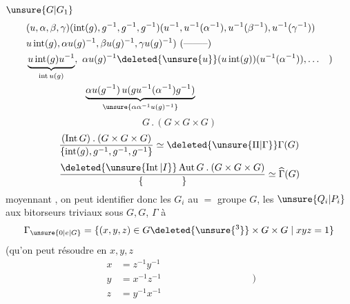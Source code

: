 \(\unsure{G|G_1}\)
\[
\begin{aligned}
 &(u,\alpha,\beta,\gamma)(\operatorname{int}(g),g^{-1},g^{-1},g^{-1})
 (u^{-1},u^{-1}(\alpha^{-1}),u^{-1}(\beta^{-1}),u^{-1}(\gamma^{-1}))\\
 &u\operatorname{int}(g),\alpha u(g)^{-1},\beta u(g)^{-1},\gamma u(g)^{-1})\ (\text{--------})\\
 &\underbrace{u\operatorname{int}(g)u^{-1}}_{\operatorname{int}u(g)},\
 \alpha u(g)^{-1}\deleted{\unsure{u}}(u\operatorname{int}(g))(u^{-1}(\alpha^{-1})),\ldots\quad)\\
 &\hspace{6em}\underbrace{\alpha u(g^{-1})\,u(gu^{-1}(\alpha^{-1})g^{-1})}_{\unsure{\alpha\alpha^{-1}u(g)^{-1}}}
\end{aligned}
\]
\[
 G\mathbin{.}(G\times G\times G)
\]
\[
 \frac{(\operatorname{Int}G)\mathbin{.}(G\times G\times G)}
 {\{\operatorname{int}(g),g^{-1},g^{-1},g^{-1}\}}
 \simeq\deleted{\unsure{\Pi|\Gamma}}\Gamma(G)
\]
\[
 \frac{\deleted{\unsure{\operatorname{Int}|I}}\operatorname{Aut}G\mathbin{.}(G\times G\times G)}
 {\{\hspace{4em}\}}\simeq\widehat \Gamma(G)
\]
moyennant , on peut identifier donc les \(G_i\) au \(=\) groupe \(G\), les \(\unsure{Q_i|P_i}\) aux bitorseurs triviaux sous \(G,G\), \(\Gamma\) à
\[
 \Gamma_{\unsure{0|e|G}}=\{(x,y,z)\in G\deleted{\unsure{^3}}\times G\times G\mid xyz=1\}
\]
(qu'on peut résoudre en \(x,y,z\)
\[
\begin{aligned}
 x&=z^{-1}y^{-1}\\
 y&=x^{-1}z^{-1}\\
 z&=y^{-1}x^{-1}
\end{aligned}\hspace{9em}\biggr)
\]

